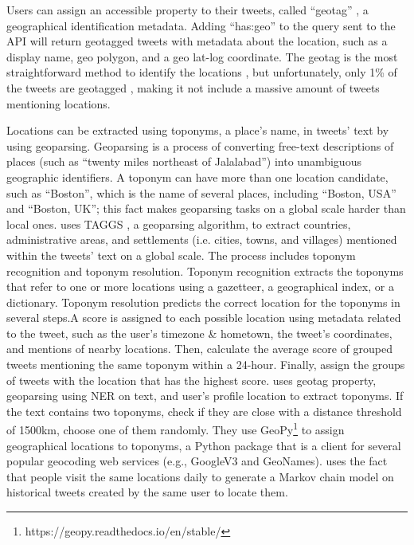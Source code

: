 Users can assign an accessible property to their tweets, called ``geotag'' , a geographical
identification metadata. Adding ``has:geo'' to the query sent to the API will return geotagged
tweets with metadata about the location, such as a display name, geo polygon, and a geo lat-log
coordinate. The geotag is the most straightforward method to identify the locations 
\cite{fengExtractionPluvialFlood2018}, but unfortunately, only 1\% of the tweets are geotagged
\cite{middletonLocationExtractionSocial2018}, making it not include a massive amount of tweets
mentioning locations.

Locations can be extracted using toponyms, a place's name, in tweets' text by using geoparsing.
Geoparsing is a process of converting free-text descriptions of places
(such as ``twenty miles northeast of Jalalabad'') into unambiguous geographic identifiers. A toponym
can have more than one location candidate, such as ``Boston'', which is the name of several places,
including ``Boston, USA'' and ``Boston, UK''; this fact makes geoparsing tasks on a global scale
harder than local ones.  uses TAGGS
, a geoparsing algorithm, to extract countries,
administrative areas, and settlements (i.e. cities, towns, and villages) mentioned within the tweets'
text on a global scale. The process includes toponym recognition and toponym resolution.  Toponym
recognition extracts the toponyms that refer to one or more locations using a gazetteer, a
geographical index, or a dictionary. Toponym resolution predicts the correct location for the
toponyms in several steps.A score is assigned to each possible location using metadata related to
the tweet, such as the user's timezone \& hometown, the tweet's coordinates, and mentions of nearby
locations. Then, calculate the average score of grouped tweets mentioning the same toponym within a
24-hour. Finally, assign the groups of tweets with the location that has the highest score.
 uses geotag property, geoparsing using
\ac{NER} on text, and user's profile location to extract toponyms. If the text contains two
toponyms, check if they are close with a distance threshold of 1500km, choose one of them randomly.
They use GeoPy\footnote{https://geopy.readthedocs.io/en/stable/} to assign geographical locations to
toponyms, a Python package that is a client for several popular geocoding web services (e.g.,
GoogleV3 and GeoNames).  uses the fact that people
visit the same locations daily to generate a Markov chain model on historical tweets created by the
same user to locate them.
 
